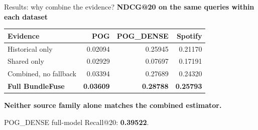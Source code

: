 \documentclass[11pt,aspectratio=169]{beamer}
\newcommand{\key}[1]{\textcolor{Accent}{\textbf{#1}}}
\begin{document}
\begin{frame}{Results: why combine the evidence?}
\textbf{NDCG@20 on the same queries within each dataset}\par
\vspace{3mm}
\centering
\renewcommand{\arraystretch}{1.4}
\begin{tabular}{lrrr}\toprule
Evidence & POG & POG\_DENSE & Spotify\\\midrule
Historical only & 0.02094 & 0.25945 & 0.21170\\
Shared only & 0.02929 & 0.07697 & 0.17191\\
Combined, no fallback & 0.03394 & 0.27689 & 0.24320\\
\key{Full BundleFuse} & \textbf{0.03609} & \textbf{0.28788} & \textbf{0.25793}\\\bottomrule
\end{tabular}\par
\par\vspace{6mm}
\key{Neither source family alone matches the combined estimator.}\par
\vspace{3mm}
POG\_DENSE full-model Recall@20: \textbf{0.39522}.
\end{frame}
\end{document}
